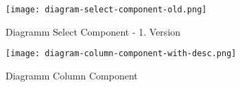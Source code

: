 




\begin{figure}[!htb]
    \centering
    \texttt{[image: diagram-select-component-old.png]}
    \caption{Diagramm Select Component - 1. Version}
    \label{Abbildung:DiagramSelectComponentOld}
\end{figure}

\begin{figure}[!htb]
    \centering
    \texttt{[image: diagram-column-component-with-desc.png]}
    \caption{Diagramm Column Component}
    \label{Abbildung:DiagramColumnComponent}
\end{figure}

